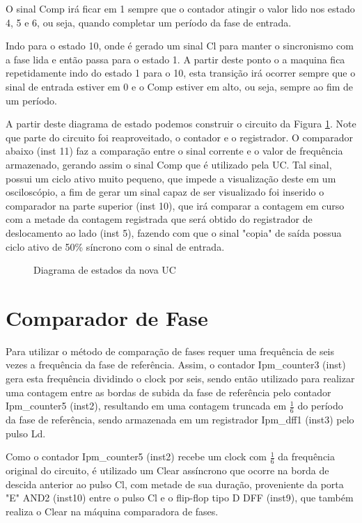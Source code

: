 O sinal Comp irá ficar em 1 sempre que o contador atingir o valor lido nos estado 4, 5 e 6, ou seja, quando completar um período da fase de entrada.

Indo para o estado 10, onde é gerado um sinal Cl para manter o sincronismo com a fase lida e então passa para o estado 1. A partir deste ponto o a maquina fica repetidamente indo do estado 1 para o 10, esta transição irá ocorrer sempre que o sinal de entrada estiver em 0 e o Comp estiver em alto, ou seja, sempre ao fim de um período.

A partir deste diagrama de estado podemos construir o circuito da Figura \ref{fig:gerador}. Note que parte do circuito foi reaproveitado, o contador e o registrador. O comparador abaixo (inst 11) faz a comparação entre o sinal corrente e o valor de frequência armazenado, gerando assim o sinal Comp que é utilizado pela UC. Tal sinal, possui um ciclo ativo muito pequeno, que impede a visualização deste em um osciloscópio, a fim de gerar um sinal capaz de ser visualizado foi inserido o comparador na parte superior (inst 10), que irá comparar a contagem em curso com a metade da contagem registrada que será obtido do registrador de deslocamento ao lado (inst 5), fazendo com que o sinal "copia" de saída possua ciclo ativo de 50\% síncrono com o sinal de entrada.

\begin{figure}[!htp]
	\centering
	\caption{Diagrama de estados da nova UC}
	\label{fig:gerador}
\end{figure}

\section{Comparador de Fase}



Para utilizar o método de comparação de fases requer uma frequência de seis vezes a frequência da fase de referência. Assim, o contador Ipm\_counter3 (inst) gera esta frequência dividindo o clock por seis, sendo então utilizado para realizar uma contagem entre as bordas de subida da fase de referência pelo contador Ipm\_counter5 (inst2), resultando em uma contagem truncada em $\frac{1}{6}$ do período da fase de referência, sendo armazenada em um registrador Ipm\_dff1 (inst3) pelo pulso Ld.

Como o contador Ipm\_counter5 (inst2) recebe um clock com $\frac{1}{6}$ da
frequência original do circuito, é utilizado um Clear assíncrono que ocorre na borda de descida anterior ao pulso Cl, com metade de sua duração, proveniente da porta "E" AND2 (inst10) entre o pulso Cl e o flip-flop tipo D DFF (inst9), que também realiza o Clear na máquina comparadora de fases.

